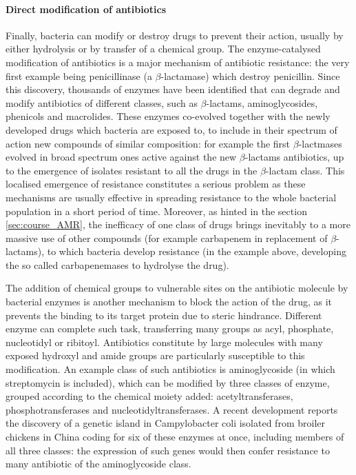\documentclass[a4paper,11pt]{extreport}
\begin{document}
\paragraph{Direct modification of antibiotics}
Finally, bacteria can modify or destroy drugs to prevent their action, usually by either hydrolysis or by transfer of a chemical group.
%
The enzyme-catalysed modification of antibiotics is a major mechanism of antibiotic resistance: the very first example being penicillinase (a $\beta$-lactamase) which destroy penicillin.\cite{Abraham1988}
%
Since this discovery, thousands of enzymes have been identified that can degrade and modify antibiotics of different classes, such as $\beta$-lactams, aminoglycosides, phenicols and macrolides.\cite{Livermore2008,Nordmann2011,Voulgari2013,Woodford2011}
%
These enzymes co-evolved together with the newly developed  drugs which bacteria are exposed to, to include in their spectrum of action new compounds of similar composition: for example the first $\beta$-lactmases evolved in broad spectrum ones active against the new $\beta$-lactams antibiotics, up to the emergence of isolates resistant to all the drugs in the $\beta$-lactam class.\cite{Woodford2013}
%
This localised emergence of resistance constitutes a serious problem as these mechanisms are usually effective in spreading resistance to the whole bacterial population in a short period of time.\cite{Voulgari2013,Woodford2013,Lynch2013} 
%
Moreover, as hinted in the section \ref{sec:course_AMR}, the inefficacy of one class of drugs brings inevitably to a more massive use of other compounds (for example carbapenem in replacement of $\beta$-lactams), to which bacteria develop resistance (in the example above, developing the so called carbapenemases to hydrolyse the drug).\cite{Queenan2007,Queenan2010,Tzouvelekis2012}

The addition of chemical groups to vulnerable sites on the antibiotic molecule by bacterial enzymes is another mechanism to block the action of the drug, as it prevents the binding to its target protein due to steric hindrance.
%
Different enzyme can complete such task, transferring many groups as acyl, phosphate, nucleotidyl or ribitoyl.\cite{Wright2005}
%
Antibiotics constitute by large molecules with many exposed hydroxyl and amide groups are particularly susceptible to this modification. An example class of such antibiotics is aminoglycoside (in which streptomycin is included), which can be modified by three classes of enzyme, grouped according to the chemical moiety added: acetyltransferases, phosphotransferases and nucleotidyltransferases.\cite{Norris2013}
%
A recent development reports the discovery of a genetic island in Campylobacter coli isolated from broiler chickens in China coding for six of these enzymes at once, including members of all three classes: the expression of such genes would then confer resistance to many antibiotic of the aminoglycoside class.\cite{Qin2012}
\end{document}
